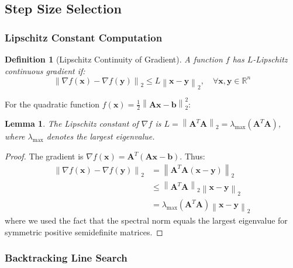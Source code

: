 \documentclass[12pt]{article}
\renewcommand{\vec}[1]{\mathbf{#1}}
\newcommand{\norm}[1]{\left\lVert#1\right\rVert}
\newcommand{\R}{\mathbb{R}}
\newtheorem{lemma}[theorem]{Lemma}
\newtheorem{definition}[theorem]{Definition}
\begin{document}
\subsection{Step Size Selection}

\subsubsection{Lipschitz Constant Computation}

\begin{definition}[Lipschitz Continuity of Gradient]
    A function $f$ has $L$-Lipschitz continuous gradient if:
    \begin{equation}
        \norm{\nabla f(\vec{x}) - \nabla f(\vec{y})}_2 \leq L\norm{\vec{x} - \vec{y}}_2, \quad \forall \vec{x}, \vec{y} \in \R^n
    \end{equation}
\end{definition}

For the quadratic function $f(\vec{x}) = \frac{1}{2}\norm{\vec{A}\vec{x} - \vec{b}}_2^2$:

\begin{lemma}\label{lem:lipschitz}
    The Lipschitz constant of $\nabla f$ is $L = \norm{\vec{A}^T\vec{A}}_2 = \lambda_{\max}(\vec{A}^T\vec{A})$, where $\lambda_{\max}$ denotes the largest eigenvalue.
\end{lemma}

\begin{proof}
    The gradient is $\nabla f(\vec{x}) = \vec{A}^T(\vec{A}\vec{x} - \vec{b})$. Thus:
    \begin{align}
        \norm{\nabla f(\vec{x}) - \nabla f(\vec{y})}_2 & = \norm{\vec{A}^T\vec{A}(\vec{x} - \vec{y})}_2                \\
                                                       & \leq \norm{\vec{A}^T\vec{A}}_2 \norm{\vec{x} - \vec{y}}_2     \\
                                                       & = \lambda_{\max}(\vec{A}^T\vec{A}) \norm{\vec{x} - \vec{y}}_2
    \end{align}
    where we used the fact that the spectral norm equals the largest eigenvalue for symmetric positive semidefinite matrices.
\end{proof}

\subsubsection{Backtracking Line Search}
\end{document}
